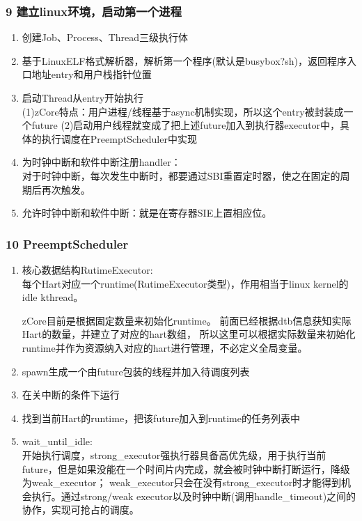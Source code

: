 \documentclass[
8pt, %
]{beamer}
\begin{document}
	\begin{frame}
		\frametitle{9 建立linux环境，启动第一个进程}
		\begin{enumerate}
			\item 创建Job、Process、Thread三级执行体
			\item 基于LinuxELF格式解析器，解析第一个程序(默认是busybox?sh)，返回程序入口地址entry和用户栈指针位置
			\item 启动Thread从entry开始执行\\
			(1)zCore特点：用户进程/线程基于async机制实现，所以这个entry被封装成一个future
			(2)启动用户线程就变成了把上述future加入到执行器executor中，具体的执行调度在PreemptScheduler中实现
			\item 为时钟中断和软件中断注册handler：\\
			对于时钟中断，每次发生中断时，都要通过SBI重置定时器，使之在固定的周期后再次触发。
			\item 允许时钟中断和软件中断：就是在寄存器SIE上置相应位。
		\end{enumerate}
	\end{frame}

	\begin{frame}
		\frametitle{10 PreemptScheduler}
		\begin{enumerate}
			\item 核心数据结构RutimeExecutor:\\
			每个Hart对应一个runtime(RutimeExecutor类型)，作用相当于linux kernel的idle kthread。
			\begin{block}{}
			zCore目前是根据固定数量来初始化runtime。
			前面已经根据dtb信息获知实际Hart的数量，并建立了对应的hart数组，
			所以这里可以根据实际数量来初始化runtime并作为资源纳入对应的hart进行管理，不必定义全局变量。
			\end{block}
			\item spawn生成一个由future包装的线程并加入待调度列表
			\item 在关中断的条件下运行
			\item 找到当前Hart的runtime，把该future加入到runtime的任务列表中
			\item wait\_until\_idle:\\
			开始执行调度，strong\_executor强执行器具备高优先级，用于执行当前future，但是如果没能在一个时间片内完成，就会被时钟中断打断运行，降级为weak\_executor；
			weak\_executor只会在没有strong\_executor时才能得到机会执行。通过strong/weak executor以及时钟中断(调用handle\_timeout)之间的协作，实现可抢占的调度。
		\end{enumerate}
	\end{frame}
\end{document}
